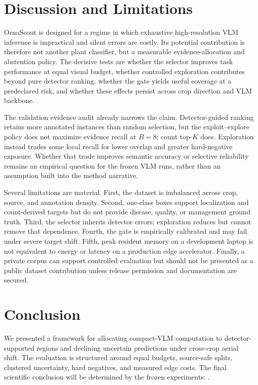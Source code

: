 \section{Discussion and Limitations}
OrnaScout is designed for a regime in which exhaustive high-resolution VLM inference is impractical and silent errors are costly. Its potential contribution is therefore not another plant classifier, but a measurable evidence-allocation and abstention policy. The decisive tests are whether the selector improves task performance at equal visual budget, whether controlled exploration contributes beyond pure detector ranking, whether the gate yields useful coverage at a predeclared risk, and whether these effects persist across crop direction and VLM backbone.

The validation evidence audit already narrows the claim. Detector-guided ranking retains more annotated instances than random selection, but the exploit--explore policy does not maximize evidence recall at $B=8$; count top-$K$ does. Exploration instead trades some local recall for lower overlap and greater hard-negative exposure. Whether that trade improves semantic accuracy or selective reliability remains an empirical question for the frozen VLM runs, rather than an assumption built into the method narrative.

Several limitations are material. First, the dataset is imbalanced across crop, source, and annotation density. Second, one-class boxes support localization and count-derived targets but do not provide disease, quality, or management ground truth. Third, the selector inherits detector errors; exploration reduces but cannot remove that dependence. Fourth, the gate is empirically calibrated and may fail under severe target shift. Fifth, peak resident memory on a development laptop is not equivalent to energy or latency on a production edge accelerator. Finally, a private corpus can support controlled evaluation but should not be presented as a public dataset contribution unless release permission and documentation are secured.

\section{Conclusion}
We presented a framework for allocating compact-VLM computation to detector-supported regions and declining uncertain predictions under cross-crop aerial shift. The evaluation is structured around equal budgets, source-safe splits, clustered uncertainty, hard negatives, and measured edge costs. The final scientific conclusion will be determined by the frozen experiments: .

